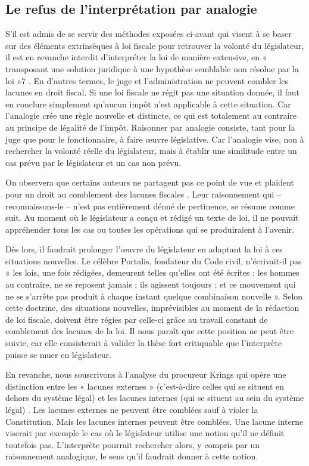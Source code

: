 \documentclass{book}
\begin{document}
\subsection*{Le refus de l’interprétation par analogie}

S’il est admis de se servir des méthodes exposées ci-avant qui visent à se baser sur des éléments extrinsèques à loi ﬁscale pour retrouver la volonté du législateur, il est en revanche interdit d’interpréter la loi de manière extensive, en « transposant une solution juridique à une hypothèse semblable non résolue par la loi »7 . En d’autres termes, le juge et l’administration ne peuvent combler les lacunes en droit ﬁscal. Si une loi ﬁscale ne régit pas une situation donnée, il faut en conclure simplement qu’aucun impôt n’est applicable à cette situation. Car l’analogie crée une règle nouvelle et distincte, ce qui est totalement au contraire au principe de légalité de l’impôt. Raisonner par analogie consiste, tant pour la juge que pour le fonctionnaire, à faire œuvre législative. Car l’analogie vise, non à rechercher la volonté réelle du législateur, mais à établir une similitude entre un cas prévu par le législateur et un cas non prévu.

On observera que certains auteurs ne partagent pas ce point de vue et plaident pour un droit au comblement des lacunes ﬁscales . Leur raisonnement qui – reconnaissons-le – n’est pas entièrement dénué de pertinence, se résume comme suit. Au moment où le législateur a conçu et rédigé un texte de loi, il ne pouvait appréhender tous les cas ou toutes les opérations qui se produiraient à l’avenir.

Dès lors, il faudrait prolonger l’œuvre du législateur en adaptant la loi à ces situations nouvelles. Le célèbre Portalis, fondateur du Code civil, n’écrivait-il pas « les lois, une fois rédigées, demeurent telles qu’elles ont été écrites ; les hommes au contraire, ne se reposent jamais ; ils agissent toujours ; et ce mouvement qui ne se s’arrête pas produit à chaque instant quelque combinaison nouvelle ». Selon cette doctrine, des situations nouvelles, imprévisibles au moment de la rédaction de loi ﬁscale, doivent être régies par celle-ci grâce au travail constant de comblement des lacunes de la loi. Il nous paraît que cette position ne peut être suivie, car elle consisterait à valider la thèse fort critiquable que l’interprète puisse se muer en législateur.

En revanche, nous souscrivons à l’analyse du procureur Krings qui opère une distinction entre les « lacunes externes » (c’est-à-dire celles qui se situent en dehors du système légal) et les lacunes internes (qui se situent au sein du système légal) . Les lacunes externes ne peuvent être comblées sauf à violer la Constitution. Mais les lacunes internes peuvent être comblées. Une lacune interne viserait par exemple le cas où le législateur utilise une notion qu’il ne déﬁnit toutefois pas. L’interprète pourrait rechercher alors, y compris par un raisonnement analogique, le sens qu’il faudrait donner à cette notion.
\end{document}
